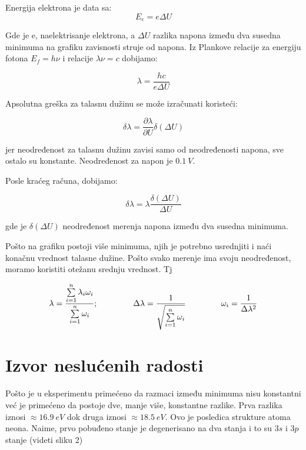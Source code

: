 \documentclass[12pt,a4paper]{article}
\begin{document}
Energija elektrona je data sa:
\begin{equation}
E_e = e \Delta U
\end{equation}

Gde je e, naelektrisanje elektrona, a $\Delta U$ razlika napona između dva susedna minimuma na grafiku zavisnosti struje od napona.  Iz Plankove relacije za energiju fotona $E_f = h\nu$ i relacije $\lambda \nu = c$ dobijamo:

\begin{equation}
\lambda = \frac{hc}{e\Delta U}
\end{equation}

Apsolutna greška za talasnu dužinu se može izračunati koristeći:

\begin{equation}
\delta \lambda = \frac{\partial \lambda }{\partial U} \delta (\Delta U)
\end{equation}

jer neodređenost za talasnu dužinu zavisi samo od neodređenosti napona, sve ostalo su konstante. Neodređenost za napon je $0.1\ V$.

Posle kraćeg računa, dobijamo:

\begin{equation}
\delta \lambda = \lambda \frac{\delta (\Delta U)}{\Delta U}
\end{equation}

gde je $\delta (\Delta U)$ neodređenost merenja napona između dva susedna minimuma.

Pošto na grafiku postoji više minimuma, njih je potrebno usrednjiti i naći konačnu vrednost talasne dužine. Pošto svako merenje ima svoju neodređenost, moramo koristiti otežanu srednju vrednost. Tj

\begin{equation}
\lambda=\frac{\sum\limits_{i=1}^n \lambda_i \omega_i}{\sum\limits_{i=1}^n \omega_i} ; \hspace{1.5cm} \Delta \lambda = \frac{1}{\sqrt{\sum\limits_{i=1}^n \omega_i}} \hspace{1.5cm} \omega_i = \frac{1}{\Delta \lambda ^2}
\end{equation}

\section*{Izvor neslućenih radosti}

Pošto je u eksperimentu primećeno da razmaci između minimuma nisu konstantni već je primećeno da postoje dve, manje više, konstantne razlike. Prva razlika iznosi $\approx16.9\ eV$ dok druga iznosi $\approx 18.5\ eV$. Ovo je posledica strukture atoma neona. Naime, prvo pobuđeno stanje je degenerisano na dva stanja i to su $3s$ i $3p$ stanje (videti sliku 2)
\end{document}
